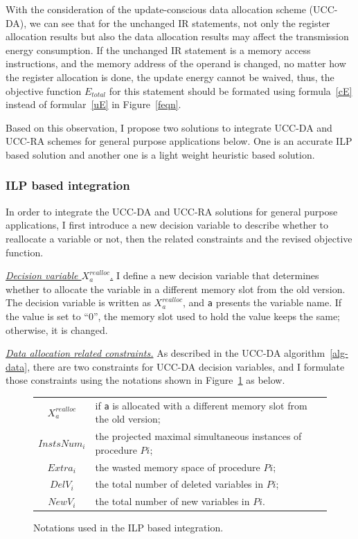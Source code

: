With the consideration of the update-conscious data allocation scheme (UCC-DA), we can see that
for the unchanged IR statements, not only the register allocation results but also the data allocation 
results may affect the transmission energy consumption. If the unchanged IR statement is a memory access instructions,
and the memory address of the operand is changed, no matter how the register allocation is done, the
update energy cannot be waived, thus, the objective function $E_{total}$ for this statement should be
formated using formula~\ref{cE} instead of formular~\ref{uE} in Figure~\ref{feqn}.

Based on this observation, I propose two solutions to integrate UCC-DA and UCC-RA schemes for general purpose
applications below. One is an accurate ILP based solution and another one is a light weight heuristic based solution.


\subsubsection{ILP based integration}
In order to integrate the UCC-DA and UCC-RA solutions for general purpose applications,
I first introduce a new decision variable to describe whether to reallocate a variable
or not, then the related constraints and the revised objective function.


{\underline{\em Decision variable $X_{a}^{realloc}$.}}
I define a new decision variable that determines whether to allocate the variable in 
a different memory slot from the old version. 
The decision variable is written as $X_{a}^{realloc}$, and {\tt a} presents the
variable name. If the value is set to ``0'', the memory slot used to hold the
value keeps the same; otherwise, it is changed.


{\underline{\em Data allocation related constraints.}}
As described in the UCC-DA algorithm~\ref{alg-data}, there are two constraints
for UCC-DA decision variables, and I formulate those constraints using the notations
shown in Figure~\ref{notation3} as below.
\begin{figure}[htbp]
\begin{tabular}{c|p{5.0in}} 
$X_{a}^{realloc}$ & if {\tt a} is allocated with a different memory slot from the old version; \\
$InstsNum_i$ & the projected maximal simultaneous instances of procedure $Pi$;\\
$Extra_i$& the wasted memory space of procedure $Pi$;\\
$DelV_i$ & the total number of deleted variables in $Pi$;\\
$NewV_i$ & the total number of new variables in $Pi$.\\
\end{tabular}
\caption{Notations used in the ILP based integration.}
\label{notation3}
\end{figure}

